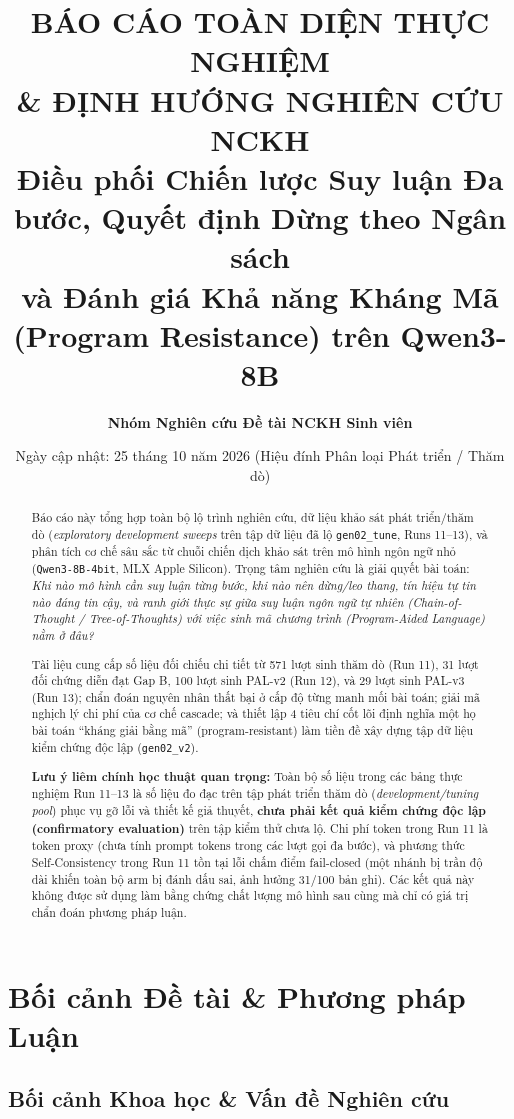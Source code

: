 \documentclass[11pt,a4paper]{report}
\title{
    \vspace{-1.5cm}
    \Huge\bfseries\color{primary} BÁO CÁO TOÀN DIỆN THỰC NGHIỆM \\ \& ĐỊNH HƯỚNG NGHIÊN CỨU NCKH \\[0.4cm]
    \Large\color{secondary} Điều phối Chiến lược Suy luận Đa bước, Quyết định Dừng theo Ngân sách \\ và Đánh giá Khả năng Kháng Mã (Program Resistance) trên Qwen3-8B
}
\author{\textbf{Nhóm Nghiên cứu Đề tài NCKH Sinh viên}}
\date{Ngày cập nhật: 25 tháng 10 năm 2026 (Hiệu đính Phân loại Phát triển / Thăm dò)}
\begin{document}
\maketitle

\begin{abstract}
Báo cáo này tổng hợp toàn bộ lộ trình nghiên cứu, dữ liệu khảo sát phát triển/thăm dò (\textit{exploratory development sweeps} trên tập dữ liệu đã lộ \texttt{gen02\_tune}, Runs 11--13), và phân tích cơ chế sâu sắc từ chuỗi chiến dịch khảo sát trên mô hình ngôn ngữ nhỏ (\texttt{Qwen3-8B-4bit}, MLX Apple Silicon). Trọng tâm nghiên cứu là giải quyết bài toán: \textit{Khi nào mô hình cần suy luận từng bước, khi nào nên dừng/leo thang, tín hiệu tự tin nào đáng tin cậy, và ranh giới thực sự giữa suy luận ngôn ngữ tự nhiên (Chain-of-Thought / Tree-of-Thoughts) với việc sinh mã chương trình (Program-Aided Language) nằm ở đâu?}

Tài liệu cung cấp số liệu đối chiếu chi tiết từ 571 lượt sinh thăm dò (Run 11), 31 lượt đối chứng diễn đạt Gap B, 100 lượt sinh PAL-v2 (Run 12), và 29 lượt sinh PAL-v3 (Run 13); chẩn đoán nguyên nhân thất bại ở cấp độ từng manh mối bài toán; giải mã nghịch lý chi phí của cơ chế cascade; và thiết lập 4 tiêu chí cốt lõi định nghĩa một họ bài toán ``kháng giải bằng mã'' (program-resistant) làm tiền đề xây dựng tập dữ liệu kiểm chứng độc lập (\texttt{gen02\_v2}).

\textbf{Lưu ý liêm chính học thuật quan trọng:} Toàn bộ số liệu trong các bảng thực nghiệm Run 11--13 là số liệu đo đạc trên tập phát triển thăm dò (\textit{development/tuning pool}) phục vụ gỡ lỗi và thiết kế giả thuyết, \textbf{chưa phải kết quả kiểm chứng độc lập (confirmatory evaluation)} trên tập kiểm thử chưa lộ. Chi phí token trong Run 11 là token proxy (chưa tính prompt tokens trong các lượt gọi đa bước), và phương thức Self-Consistency trong Run 11 tồn tại lỗi chấm điểm fail-closed (một nhánh bị trần độ dài khiến toàn bộ arm bị đánh dấu sai, ảnh hưởng 31/100 bản ghi). Các kết quả này không được sử dụng làm bằng chứng chất lượng mô hình sau cùng mà chỉ có giá trị chẩn đoán phương pháp luận.
\end{abstract}

\tableofcontents
\newpage

\chapter{Bối cảnh Đề tài \& Phương pháp Luận}

\section{Bối cảnh Khoa học \& Vấn đề Nghiên cứu}
\end{document}

